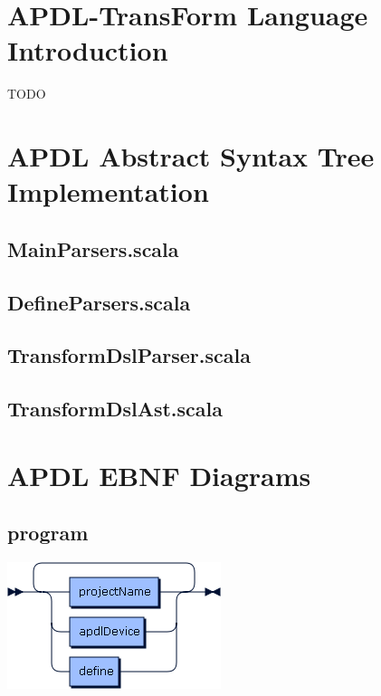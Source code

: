 \begin{appendices}
  
\chapter{APDL-TransForm Language Introduction}
\label{app:tf-getting-started}

TODO

\chapter{APDL Abstract Syntax Tree Implementation}
\label{app:apdl_ast_implementation}

\section*{MainParsers.scala}

\section*{DefineParsers.scala}

\section*{TransformDslParser.scala}

\section*{TransformDslAst.scala}

\chapter{APDL EBNF Diagrams}
\label{app:apdl_ebnf_diagramm}

\section*{program}\includegraphics[scale=0.7]{img/ebnf_grammar/program}

\end{appendices}
